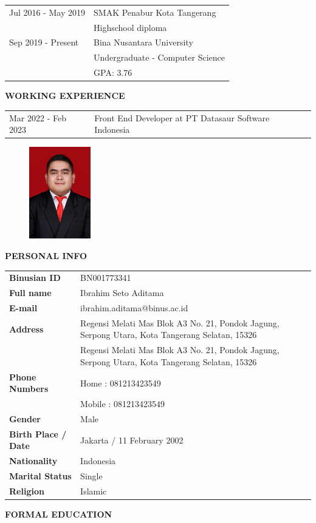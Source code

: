 \documentclass[a4paper]{article}
\begin{document}
\begin{center}
\begin{longtable}[c]{p{5cm}p{7cm}}
   Jul 2016 - May 2019 & SMAK Penabur Kota Tangerang\\
                         & Highschool diploma\\
   Sep 2019 - Present & Bina Nusantara University\\
                              & Undergraduate - Computer Science\\
                              & GPA: 3.76\\
\end{longtable}
\end{center}
\textbf{WORKING EXPERIENCE}

\begin{center}
\begin{longtable}[c]{p{5cm}p{7cm}}
Mar 2022 - Feb 2023 & Front End Developer at PT Datasaur Software Indonesia\\
\end{longtable}
\end{center}

\newpage
\begin{figure}[h]
    \includegraphics*[height=4cm]{./images/foto/seto.jpg}
    \centering
\end{figure}

\noindent\textbf{PERSONAL INFO}

\begin{center}
\begin{longtable}[c]{p{5cm}p{7cm}}
    \textbf{Binusian ID} & BN001773341\\
    \textbf{Full name} & Ibrahim Seto Aditama\\
    \textbf{E-mail} & ibrahim.aditama@binus.ac.id\\
    \textbf{Address} & Regensi Melati Mas Blok A3 No. 21, Pondok Jagung, Serpong Utara, Kota Tangerang Selatan, 15326\\
     & Regensi Melati Mas Blok A3 No. 21, Pondok Jagung, Serpong Utara, Kota Tangerang Selatan, 15326\\
    \textbf{Phone Numbers} & Home   : 081213423549\\
                           & Mobile : 081213423549\\
    \textbf{Gender} & Male\\
    \textbf{Birth Place / Date} & Jakarta / 11 February 2002\\
    \textbf{Nationality} & Indonesia\\
    \textbf{Marital Status} & Single\\
    \textbf{Religion} & Islamic\\
\end{longtable}
\end{center}
\newpage
\noindent\textbf{FORMAL EDUCATION}
\end{document}

